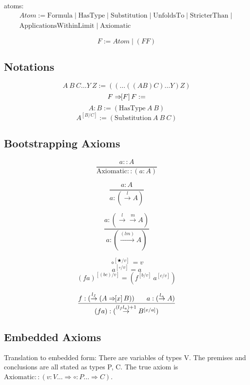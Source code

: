 \documentclass{article}
\newcommand{\presep}{\hspace{1.8em}}
\newcommand{\subst}[3]{#1^{[{#2}{/}{#3}]}}
\newcommand{\bindvariable}{\bigstar}
\newcommand{\hole}{\circ}
\newcommand{\hastype}[2]{#1 : #2}
\newcommand{\hastypemeta}[2]{#1 :: #2}
\newcommand{\namemappingtype}[3]{#1:#2 \Rightarrow #3}
\newcommand{\treemappinguntyped}[2]{\Rightarrow\hspace{-0.4em}[#1]\,#2}
\newcommand{\treemappingtype}[3]{#1 \treemappinguntyped{#2}{#3}}
\newcommand{\unfoldsin}[1]{\overset{#1}{\rightarrow}}
\begin{document}
  
  atoms:
  \begin{multline*}
   Atom := \mathrm{Formula} \mid \mathrm{HasType} \mid \mathrm{Substitution} \mid \mathrm{UnfoldsTo} \mid \mathrm{StricterThan} \mid\\
   \mathrm{ApplicationsWithinLimit} \mid \mathrm{Axiomatic}
  \end{multline*}


  \[ F := Atom \mid (F F) \]


  \subsection{Notations}

  \[ A\ B\ C \dots Y\ Z := ((\dots ((A B) C) \dots Y) Z) \]
  \[ \treemappingtype{F}{F}{F} := \]
  \[ \hastype{A}{B} := (\mathrm{HasType}\ A\ B) \]
  \[ \subst{A}{B}{C} := (\mathrm{Substitution}\ A\ B\ C) \]

  \subsection{Bootstrapping Axioms}

  \[ \frac{\hastypemeta{a}{A}}{\hastypemeta{\mathrm{Axiomatic}}{(\hastype{a}{A})}} \]


  \[ \frac{
    \hastype{a}{A}
  }{
    \hastype{a}{(\unfoldsin{l}A)}
  } \]

  \[ \frac{
    \hastype{a}{(\unfoldsin{l}\unfoldsin{m}A)}
  }{
    \hastype{a}{(\unfoldsin{(l m)}A)}
  } \]

  \[\subst{\hole}{\bindvariable}{v} = v\]
  \[\subst{a}{\hole}{v} = a\]
  \[\subst{(f a)}{(bc)}{v} = (\subst{f}{b}{v}\ \subst{a}{c}{v})\]

  \[ \frac{
    \hastype{f}{(\unfoldsin{l_f} (\treemappingtype{A}{x}{B}))}
    \presep
    \hastype{a}{(\unfoldsin{l_a} A)}
  }{
    \hastype{(f a)}{(\unfoldsin{(l_f l_a)+1} \subst{B}{x}{a})}
  } \]

  \subsection{Embedded Axioms}
  
  Translation to embedded form: There are variables of types V. The premises and conclusions are all stated as types P, C. The true axiom is $\hastypemeta{\mathrm{Axiomatic}}{(\namemappingtype{v}{V\dots}{\namemappingtype{\hole}{P\dots}{C}})}$.

\end{document}
